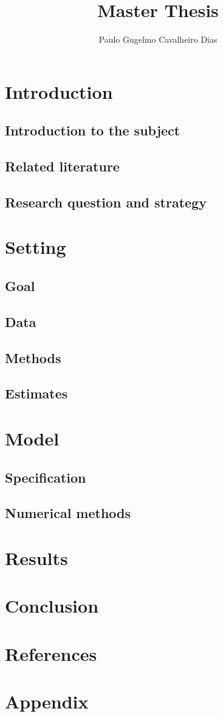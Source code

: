 \documentclass{article}
\author{Paulo Gugelmo Cavalheiro Dias}
\title{Master Thesis}
\begin{document}
\maketitle

\section{Introduction}

\subsection{Introduction to the subject}
\subsection{Related literature}
\subsection{Research question and strategy}

\section{Setting}

\subsection{Goal}
\subsection{Data}
\subsection{Methods}
\subsection{Estimates}

\section{Model}

\subsection{Specification}
\subsection{Numerical methods}

\section{Results}

\section{Conclusion}

\section{References}

\section{Appendix}
\end{document}
